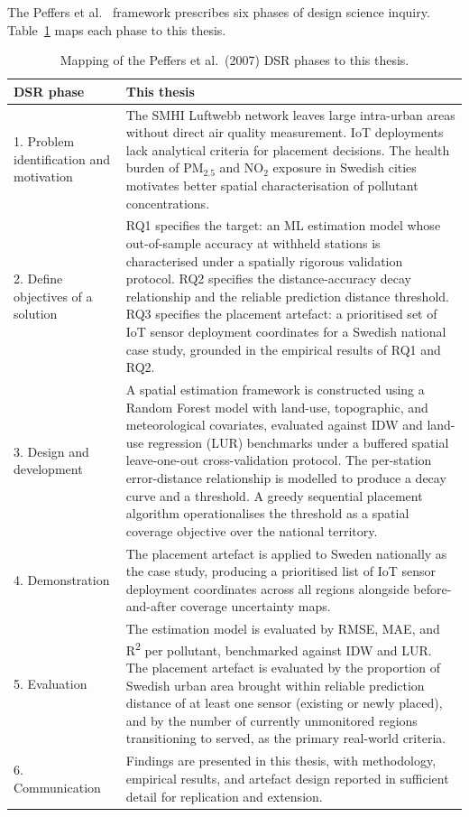 \documentclass[11pt,a4paper]{article}
\begin{document}
The Peffers et al.\ \cite{peffers_dsr_2007} framework prescribes six phases of design science inquiry. Table~\ref{tab:dsr-mapping} maps each phase to this thesis.

\begin{table}[H]
\centering
\caption{Mapping of the Peffers et al.\ (2007) DSR phases to this thesis.}
\label{tab:dsr-mapping}
\footnotesize
\renewcommand{\arraystretch}{0.9}
\setlength{\tabcolsep}{4pt}
\begin{tabular}{p{} p{}}
\toprule
\textbf{DSR phase} & \textbf{This thesis} \\
\midrule
1. Problem identification and motivation &
  The SMHI Luftwebb network leaves large intra-urban areas without direct air quality measurement. IoT deployments lack analytical criteria for placement decisions. The health burden of PM$_{2.5}$ and NO$_2$ exposure in Swedish cities motivates better spatial characterisation of pollutant concentrations. \\
2. Define objectives of a solution &
  RQ1 specifies the target: an ML estimation model whose out-of-sample accuracy at withheld stations is characterised under a spatially rigorous validation protocol. RQ2 specifies the distance-accuracy decay relationship and the reliable prediction distance threshold. RQ3 specifies the placement artefact: a prioritised set of IoT sensor deployment coordinates for a Swedish national case study, grounded in the empirical results of RQ1 and RQ2. \\
3. Design and development &
  A spatial estimation framework is constructed using a Random Forest model with land-use, topographic, and meteorological covariates, evaluated against IDW and land-use regression (LUR) benchmarks under a buffered spatial leave-one-out cross-validation protocol. The per-station error-distance relationship is modelled to produce a decay curve and a threshold. A greedy sequential placement algorithm operationalises the threshold as a spatial coverage objective over the national territory. \\
4. Demonstration &
  The placement artefact is applied to Sweden nationally as the case study, producing a prioritised list of IoT sensor deployment coordinates across all regions alongside before-and-after coverage uncertainty maps. \\
5. Evaluation &
  The estimation model is evaluated by RMSE, MAE, and R\textsuperscript{2} per pollutant, benchmarked against IDW and LUR. The placement artefact is evaluated by the proportion of Swedish urban area brought within reliable prediction distance of at least one sensor (existing or newly placed), and by the number of currently unmonitored regions transitioning to served, as the primary real-world criteria. \\
6. Communication &
  Findings are presented in this thesis, with methodology, empirical results, and artefact design reported in sufficient detail for replication and extension. \\
\bottomrule
\end{tabular}
\end{table}
\end{document}

